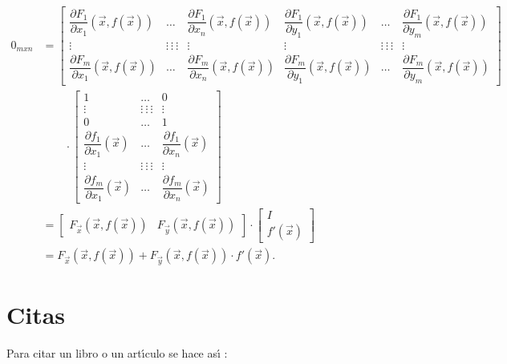 \begin{align*}
0_{mxn} & = \begin{bmatrix} \dfrac{\partial F_1}{\partial x_1}(\vec{x},f(\vec{x})) & \dots &
\dfrac{\partial F_1}{\partial x_n}(\vec{x},f(\vec{x})) & \dfrac{\partial
F_1}{\partial y_1}(\vec{x},f(\vec{x})) & \dots & \dfrac{\partial F_1}{\partial y_m}(\vec{x},f(\vec{x})) \\
\vdots & \vdots \: \vdots \: \vdots  & \vdots & \vdots & \vdots \: \vdots \: \vdots  &
\vdots\\  \dfrac{\partial F_m}{\partial x_1}(\vec{x},f(\vec{x})) & \dots  & \dfrac{\partial
F_m}{\partial x_n}(\vec{x},f(\vec{x})) & \dfrac{\partial F_m}{\partial y_1}
(\vec{x},f(\vec{x}))& \dots & \dfrac{\partial F_m}{\partial y_m}(\vec{x},f(\vec{x}))
\end{bmatrix}\\
   & \qquad  \cdot  \begin{bmatrix}  1 & \dots & 0\\ \vdots & \vdots \: \vdots \: \vdots  &
\vdots \\ 0 & \dots & 1\\
\dfrac{\partial f_1}{\partial x_1}(\vec{x}) &  \dots  & \dfrac{\partial f_1}{\partial x_n}(\vec{x}) \\
\vdots & \vdots \: \vdots \: \vdots  &
\vdots \\
\dfrac{\partial f_m}{\partial x_1}(\vec{x}) &  \dots  & \dfrac{\partial f_m}{\partial
x_n}(\vec{x})
\end{bmatrix}
  \\
 & = \begin{bmatrix} F_{\vec{x}}(\vec{x}, f(\vec{x})) &
F_{\vec{y}}(\vec{x}, f(\vec{x})) \end{bmatrix} \cdot  \begin{bmatrix}   I \\
f'(\vec{x})
\end{bmatrix} \\
 & = F_{\vec{x}}(\vec{x},f(\vec{x})) + F_{\vec{y}}(\vec{x},f(\vec{x})) \cdot f'(\vec{x}).
\end{align*}





\section{Citas}

Para citar un libro o un art\'{\i}culo se hace as\'{\i} : \cite{ADRS} \cite{Ar}
